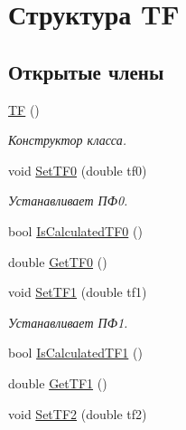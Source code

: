 \hypertarget{struct_t_f}{
\section{Структура TF}
\label{struct_t_f}
}
\subsection*{Открытые члены}
\begin{DoxyCompactItemize}
\item 
\hypertarget{struct_t_f_acfb0c355c8aca8898295cf128522bccc}{
\hyperlink{struct_t_f_acfb0c355c8aca8898295cf128522bccc}{TF} ()}
\label{struct_t_f_acfb0c355c8aca8898295cf128522bccc}

\begin{DoxyCompactList}\small\item\em Конструктор класса. \item\end{DoxyCompactList}\item 
\hypertarget{struct_t_f_a428809b6365830f15e93a2348e49ff31}{
void \hyperlink{struct_t_f_a428809b6365830f15e93a2348e49ff31}{SetTF0} (double tf0)}
\label{struct_t_f_a428809b6365830f15e93a2348e49ff31}

\begin{DoxyCompactList}\small\item\em Устанавливает ПФ0. \item\end{DoxyCompactList}\item 
bool \hyperlink{struct_t_f_a5554ca2e72a065f1cfde88ec7bf98164}{IsCalculatedTF0} ()
\item 
double \hyperlink{struct_t_f_a5bfce7a7f2a55b1962a89f73affb71d2}{GetTF0} ()
\item 
\hypertarget{struct_t_f_a83875b177c9ac0aa0156ed0b0a5f622f}{
void \hyperlink{struct_t_f_a83875b177c9ac0aa0156ed0b0a5f622f}{SetTF1} (double tf1)}
\label{struct_t_f_a83875b177c9ac0aa0156ed0b0a5f622f}

\begin{DoxyCompactList}\small\item\em Устанавливает ПФ1. \item\end{DoxyCompactList}\item 
bool \hyperlink{struct_t_f_af6187d2f00ac8b18fd3e35a2a3fac0b2}{IsCalculatedTF1} ()
\item 
double \hyperlink{struct_t_f_a1c8df6fca600a8f87d9b2b6bdee801cd}{GetTF1} ()
\item 
\hypertarget{struct_t_f_aa4a9334cb21255f84f51b92d1e532e42}{
void \hyperlink{struct_t_f_aa4a9334cb21255f84f51b92d1e532e42}{SetTF2} (double tf2)}
\label{struct_t_f_aa4a9334cb21255f84f51b92d1e532e42}


\end{DoxyCompactItemize}

